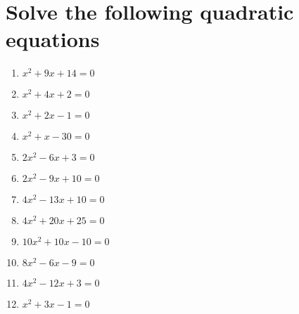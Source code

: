 \documentclass[12pt]{article}
\begin{document}
\section*{Solve the following quadratic equations}
\begin{minipage}[t]{0.45\textwidth}
    \begin{enumerate}[label=\#\arabic*]
        \setcounter{enumi}{0} %
        \item  $x^2+9x+14=0$
        \vspace{2em}
        \item  $x^2+4x+2=0$
        \vspace{2em}
        \item  $x^2+2x-1=0$
        \vspace{2em}
        \item  $x^2+x-30=0$
        \vspace{2em}
        \item  $2x^2-6x+3=0$
        \vspace{2em}
        \item  $2x^2-9x+10=0$
        \end{enumerate}
\end{minipage}%
\hspace{1cm}
\begin{minipage}[t]{0.45\textwidth}
    \begin{enumerate}[label=\#\arabic*]
        \setcounter{enumi}{6} %
        \item  $4x^2-13x+10=0$
        \vspace{2em}
        \item  $4x^2+20x+25=0$
        \vspace{2em}
        \item  $10x^2+10x-10=0$
        \vspace{2em}
        \item  $8x^2-6x-9=0$
        \vspace{2em}
        \item  $4x^2-12x+3=0$
        \vspace{2em}
        \item  $x^2+3x-1=0$

    \end{enumerate}
\end{minipage}
\end{document}
